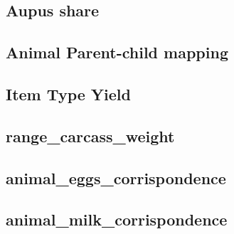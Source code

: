 \documentclass[nojss]{jss}
\begin{document}
\subsection{Aupus share}
\subsection{Animal Parent-child mapping}
\subsection{Item Type Yield}
\subsection{range_carcass_weight}
\subsection{animal_eggs_corrispondence}
\subsection{animal_milk_corrispondence}
\end{document}
